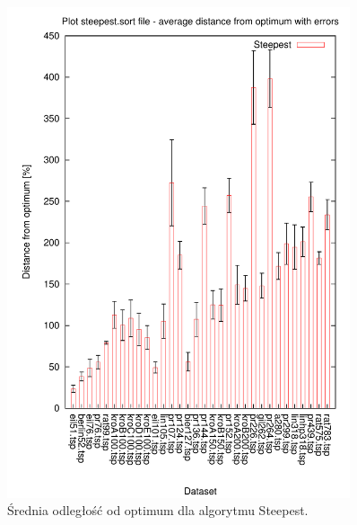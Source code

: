 \begin{figure}
\begin{center}
\includegraphics[width=0.9\textwidth]{wykresy/steepest_av_sort}
\end{center}
\caption{Średnia odległość od optimum dla algorytmu Steepest.}
\label{steepest_av_sort}
\end{figure}


